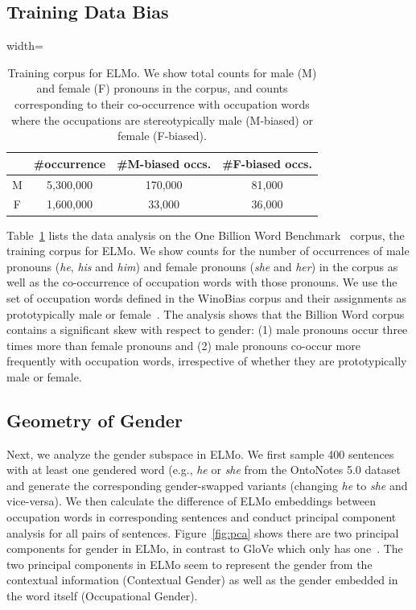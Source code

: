 \documentclass[11pt,a4paper]{article}
\newcommand{\word}[1]{\textit{#1}}
\begin{document}
\subsection{Training Data Bias}
\begin{table}[t]
\small
    \centering
    \begin{adjustbox}{width=\columnwidth}
    \begin{tabular}{c|c|c|c}
    \hline
    & \#occurrence & \#M-biased occs. &\#F-biased occs. \\
    \hline
    M & 5,300,000& 170,000& 81,000 \\
    F & 1,600,000&33,000 &36,000\\
         \hline
    \end{tabular}
     \end{adjustbox}
    \caption{Training corpus for ELMo. We show total counts for male (M) and female (F) pronouns in the corpus, and counts corresponding to their co-occurrence with occupation words where the occupations are stereotypically male (M-biased) or female (F-biased). }
    \vspace{-10pt}
    \label{tab:lm_cor}
\end{table}

Table~\ref{tab:lm_cor} lists the data analysis on the One Billion Word Benchmark~\cite{chelba2013one} corpus, the training corpus for ELMo.
We show counts for the number of occurrences of male pronouns (\word{he}, \word{his} and \word{him}) and female pronouns (\word{she} and \word{her}) in the corpus as well as the co-occurrence of occupation words with those pronouns.
We use the set of occupation words defined in the WinoBias corpus and their assignments as prototypically male or female~\cite{ZWYOC18}.
The analysis shows that the Billion Word corpus contains a significant skew with respect to gender: (1) male pronouns occur three times more than female pronouns and (2) male pronouns co-occur more frequently with occupation words, irrespective of whether they are prototypically male or female.

\subsection{Geometry of Gender}
\label{sec:pca}
Next, we analyze the gender subspace in ELMo.
We first sample 400 sentences with at least one gendered word (e.g., \textit{he} or \textit{she} from the OntoNotes 5.0 dataset~\cite{weischedel2012ontonotes} and generate the corresponding gender-swapped variants (changing \textit{he} to \textit{she} and vice-versa).
We then calculate the difference of ELMo embeddings between occupation words in corresponding sentences and conduct principal component analysis for all pairs of sentences.
Figure~\ref{fig:pca} shows there are two principal components for gender in ELMo, in contrast to GloVe which only has one~\cite{BCWS16}. The two principal components in ELMo seem to represent the gender from the contextual information (Contextual Gender) as well as the gender embedded in the word itself (Occupational Gender).
\end{document}
